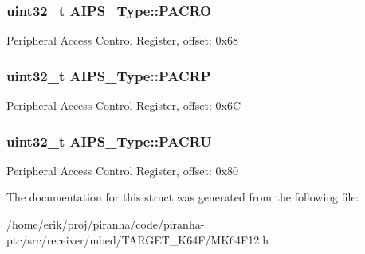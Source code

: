 \subsubsection[{\texorpdfstring{P\+A\+C\+RO}{PACRO}}]{ uint32\+\_\+t A\+I\+P\+S\+\_\+\+Type\+::\+P\+A\+C\+RO}\hypertarget{structAIPS__Type_a9f991cdcc91884075eec4a214e4d3207}{}\label{structAIPS__Type_a9f991cdcc91884075eec4a214e4d3207}
Peripheral Access Control Register, offset\+: 0x68 
\subsubsection[{\texorpdfstring{P\+A\+C\+RP}{PACRP}}]{ uint32\+\_\+t A\+I\+P\+S\+\_\+\+Type\+::\+P\+A\+C\+RP}\hypertarget{structAIPS__Type_aa1979343c5ff683d3cae246129c8eb56}{}\label{structAIPS__Type_aa1979343c5ff683d3cae246129c8eb56}
Peripheral Access Control Register, offset\+: 0x6C 
\subsubsection[{\texorpdfstring{P\+A\+C\+RU}{PACRU}}]{ uint32\+\_\+t A\+I\+P\+S\+\_\+\+Type\+::\+P\+A\+C\+RU}\hypertarget{structAIPS__Type_a9e7f79c14ce825edd6aeb4bb2af2e2ea}{}\label{structAIPS__Type_a9e7f79c14ce825edd6aeb4bb2af2e2ea}
Peripheral Access Control Register, offset\+: 0x80 

The documentation for this struct was generated from the following file\+:\begin{DoxyCompactItemize}
\item 
/home/erik/proj/piranha/code/piranha-\/ptc/src/receiver/mbed/\+T\+A\+R\+G\+E\+T\+\_\+\+K64\+F/M\+K64\+F12.\+h\end{DoxyCompactItemize}
